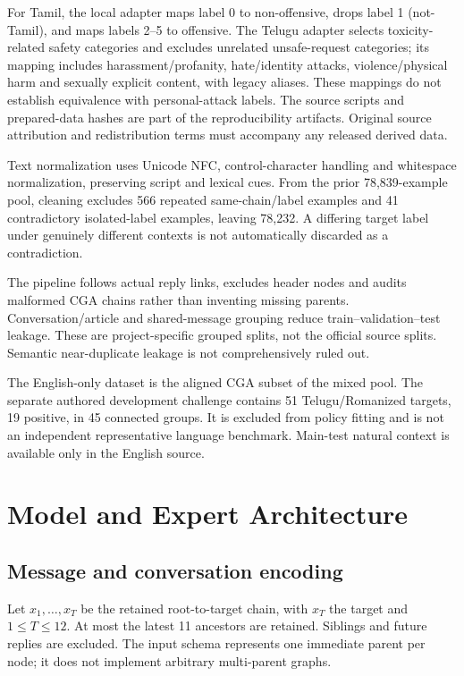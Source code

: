 \documentclass[11pt,a4paper]{article}
\begin{document}
For Tamil, the local adapter maps label 0 to non-offensive, drops label 1 (not-Tamil), and maps labels 2--5 to offensive. The Telugu adapter selects toxicity-related safety categories and excludes unrelated unsafe-request categories; its mapping includes harassment/profanity, hate/identity attacks, violence/physical harm and sexually explicit content, with legacy aliases. These mappings do not establish equivalence with personal-attack labels. The source scripts and prepared-data hashes are part of the reproducibility artifacts. Original source attribution and redistribution terms must accompany any released derived data.

Text normalization uses Unicode NFC, control-character handling and whitespace normalization, preserving script and lexical cues. From the prior 78,839-example pool, cleaning excludes 566 repeated same-chain/label examples and 41 contradictory isolated-label examples, leaving 78,232. A differing target label under genuinely different contexts is not automatically discarded as a contradiction.

The pipeline follows actual reply links, excludes header nodes and audits malformed CGA chains rather than inventing missing parents. Conversation/article and shared-message grouping reduce train--validation--test leakage. These are project-specific grouped splits, not the official source splits. Semantic near-duplicate leakage is not comprehensively ruled out.

The English-only dataset is the aligned CGA subset of the mixed pool. The separate authored development challenge contains 51 Telugu/Romanized targets, 19 positive, in 45 connected groups. It is excluded from policy fitting and is not an independent representative language benchmark. Main-test natural context is available only in the English source.

\section{Model and Expert Architecture}
\subsection{Message and conversation encoding}
Let $x_1,\ldots,x_T$ be the retained root-to-target chain, with $x_T$ the target and $1\leq T\leq12$. At most the latest 11 ancestors are retained. Siblings and future replies are excluded. The input schema represents one immediate parent per node; it does not implement arbitrary multi-parent graphs.
\end{document}
